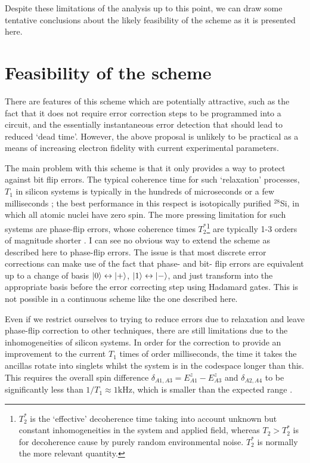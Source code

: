 \documentclass{report}
\begin{document}
Despite these limitations of the analysis up to this point, we can draw some tentative conclusions about the likely feasibility of the scheme as it is presented here.

\section{Feasibility of the scheme}\label{sec:feasibility}
There are features of this scheme which are potentially attractive, such as the fact that it does not require error correction steps to be programmed into a circuit, and the essentially instantaneous error detection that should lead to reduced `dead time'. However, the above proposal is unlikely to be practical as a means of increasing electron fidelity with current experimental parameters. 

The main problem with this scheme is that it only provides a way to protect against bit flip errors. The typical coherence time for such `relaxation' processes, $T_1$ in silicon systems is typically in the hundreds of microseconds or a few milliseconds \cite{Loss2022}\cite{Zwerver2022}; the best performance in this respect is isotopically purified $^{28}$Si, in which all atomic nuclei have zero spin. The more pressing limitation for such systems are phase-flip errors, whose coherence times $T_2^*$\footnote{$T_2^*$ is the `effective' decoherence time taking into account unknown but constant inhomogeneities in the system and applied field, whereas $T_2 > T_2^*$ is for decoherence cause by purely random environmental noise. $T_2^*$ is normally the more relevant quantity.} are typically 1-3 orders of magnitude shorter \cite{Loss2022}. I can see no obvious way to extend the scheme as described here to phase-flip errors. The issue is that most discrete error corrections can make use of the fact that phase- and bit- flip errors are equivalent up to a change of basis $\ket{0} \leftrightarrow \ket{+}$, $\ket{1}\leftrightarrow\ket{-}$, and just transform into the appropriate basis before the error correcting step using Hadamard gates. This is not possible in a continuous scheme like the one described here.

Even if we restrict ourselves to trying to reduce errors due to relaxation and leave phase-flip correction to other techniques, there are still limitations due to the inhomogeneities of silicon systems. In order for the correction to provide an improvement to the current $T_1$ times of order milliseconds, the time it takes the ancillas rotate into singlets whilst the system is in the codespace longer than this. This requires the overall spin difference $\delta_{A1, A3} = E_{A1}^z - E_{A3}^z$ and $\delta_{A2, A4}$ to be significantly less than $1/T_1 \approx 1\unit{\kilo\hertz}$, which is smaller than the expected range \cite{Hwang2017}.
\end{document}
